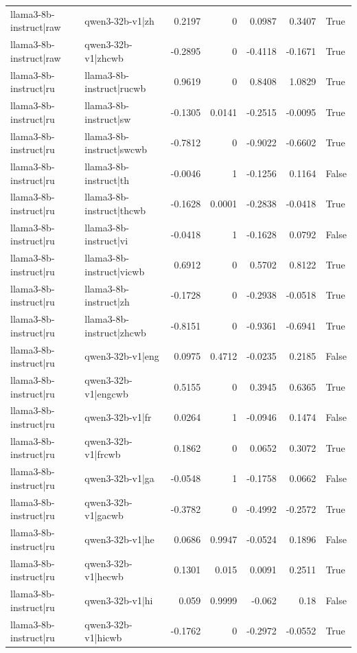\begin{table}
\begin{tabular}{l l r r r r l}
llama3-8b-instruct|raw & qwen3-32b-v1|zh & 0.2197 & 0 & 0.0987 & 0.3407 & True \\
llama3-8b-instruct|raw & qwen3-32b-v1|zhcwb & -0.2895 & 0 & -0.4118 & -0.1671 & True \\
llama3-8b-instruct|ru & llama3-8b-instruct|rucwb & 0.9619 & 0 & 0.8408 & 1.0829 & True \\
llama3-8b-instruct|ru & llama3-8b-instruct|sw & -0.1305 & 0.0141 & -0.2515 & -0.0095 & True \\
llama3-8b-instruct|ru & llama3-8b-instruct|swcwb & -0.7812 & 0 & -0.9022 & -0.6602 & True \\
llama3-8b-instruct|ru & llama3-8b-instruct|th & -0.0046 & 1 & -0.1256 & 0.1164 & False \\
llama3-8b-instruct|ru & llama3-8b-instruct|thcwb & -0.1628 & 0.0001 & -0.2838 & -0.0418 & True \\
llama3-8b-instruct|ru & llama3-8b-instruct|vi & -0.0418 & 1 & -0.1628 & 0.0792 & False \\
llama3-8b-instruct|ru & llama3-8b-instruct|vicwb & 0.6912 & 0 & 0.5702 & 0.8122 & True \\
llama3-8b-instruct|ru & llama3-8b-instruct|zh & -0.1728 & 0 & -0.2938 & -0.0518 & True \\
llama3-8b-instruct|ru & llama3-8b-instruct|zhcwb & -0.8151 & 0 & -0.9361 & -0.6941 & True \\
llama3-8b-instruct|ru & qwen3-32b-v1|eng & 0.0975 & 0.4712 & -0.0235 & 0.2185 & False \\
llama3-8b-instruct|ru & qwen3-32b-v1|engcwb & 0.5155 & 0 & 0.3945 & 0.6365 & True \\
llama3-8b-instruct|ru & qwen3-32b-v1|fr & 0.0264 & 1 & -0.0946 & 0.1474 & False \\
llama3-8b-instruct|ru & qwen3-32b-v1|frcwb & 0.1862 & 0 & 0.0652 & 0.3072 & True \\
llama3-8b-instruct|ru & qwen3-32b-v1|ga & -0.0548 & 1 & -0.1758 & 0.0662 & False \\
llama3-8b-instruct|ru & qwen3-32b-v1|gacwb & -0.3782 & 0 & -0.4992 & -0.2572 & True \\
llama3-8b-instruct|ru & qwen3-32b-v1|he & 0.0686 & 0.9947 & -0.0524 & 0.1896 & False \\
llama3-8b-instruct|ru & qwen3-32b-v1|hecwb & 0.1301 & 0.015 & 0.0091 & 0.2511 & True \\
llama3-8b-instruct|ru & qwen3-32b-v1|hi & 0.059 & 0.9999 & -0.062 & 0.18 & False \\
llama3-8b-instruct|ru & qwen3-32b-v1|hicwb & -0.1762 & 0 & -0.2972 & -0.0552 & True \\

\end{tabular}
\end{table}
